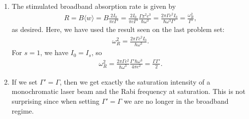 \documentclass{article}
\theoremstyle{definition}
\newcommand{\f}[2]{\frac{#1}{#2}}
\begin{document}
\begin{enumerate}[label=(\alph*)]
	\item The stimulated broadband absorption rate is given by 
	\begin{align*}
	R = B\langle w\rangle= B \f{2I_0}{\pi c \Gamma'} = \f{2I_0}{\pi c \Gamma'} \f{\Gamma \pi^2 c^3}{\hbar \omega^3} = \f{2\pi \Gamma c^2 I_0}{\hbar \omega^3 \Gamma'} = \f{\omega_R^2}{\Gamma'},  
	\end{align*}
	as desired. Here, we have used the result seen on the last problem set:
	\begin{align*}
	\omega_R^2 = \f{2\pi \Gamma c^2 I_0}{\hbar \omega^3}.
	\end{align*}
	For $s=1$, we have $I_0 = I_s$, so
	\begin{align*}
	\omega_R^2 = \f{2\pi \Gamma c^2 }{\hbar \omega^3} \f{\Gamma' \hbar \omega^3}{4\pi c^2} = \f{\Gamma \Gamma'}{2}.
	\end{align*}
	
	\item If we set $\Gamma' = \Gamma$, then we get exactly the saturation intensity of a monochromatic laser beam and the Rabi frequency at saturation. This is not surprising since when setting $\Gamma'=\Gamma$ we are no longer in the broadband regime. 
\end{enumerate}

	
	
\end{document}
